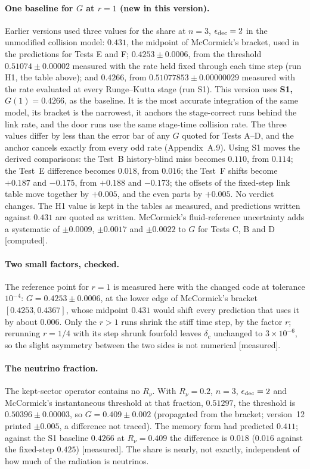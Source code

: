 \documentclass[11pt]{article}
\newcommand{\grade}[1]{\textsf{\small[#1]}}
\begin{document}
\paragraph{One baseline for $G$ at $r=1$ (new in this version).} Earlier versions used three values for the share at $n=3$, $\epsilon_{\rm dec}=2$ in the unmodified collision model: $0.431$, the midpoint of McCormick's bracket, used in the predictions for Tests E and F; $0.4253\pm0.0006$, from the threshold $0.51074\pm0.00002$ measured with the rate held fixed through each time step (run H1, the table above); and $0.4266$, from $0.51077853\pm0.00000029$ measured with the rate evaluated at every Runge--Kutta stage (run S1). This version uses \textbf{S1, $G(1)=0.4266$}, as the baseline. It is the most accurate integration of the same model, its bracket is the narrowest, it anchors the stage-correct runs behind the link rate, and the door runs use the same stage-time collision rate. The three values differ by less than the error bar of any $G$ quoted for Tests A--D, and the anchor cancels exactly from every odd rate (Appendix~A.9). Using S1 moves the derived comparisons: the Test~B history-blind miss becomes $0.110$, from $0.114$; the Test~E difference becomes $0.018$, from $0.016$; the Test~F shifts become $+0.187$ and $-0.175$, from $+0.188$ and $-0.173$; the offsets of the fixed-step link table move together by $+0.005$, and the even parts by $+0.005$. No verdict changes. The H1 value is kept in the tables as measured, and predictions written against $0.431$ are quoted as written. McCormick's fluid-reference uncertainty adds a systematic of $\pm0.0009$, $\pm0.0017$ and $\pm0.0022$ to $G$ for Tests C, B and D \grade{computed}.

\paragraph{Two small factors, checked.} The reference point for $r=1$ is measured here with the changed code at tolerance $10^{-4}$: $G=0.4253\pm0.0006$, at the lower edge of McCormick's bracket $[0.4253,0.4367]$, whose midpoint $0.431$ would shift every prediction that uses it by about $0.006$. Only the $r>1$ runs shrink the stiff time step, by the factor $r$; rerunning $r=1/4$ with its step shrunk fourfold leaves $\delta_c$ unchanged to $3\times10^{-6}$, so the slight asymmetry between the two sides is not numerical \grade{measured}.

\paragraph{The neutrino fraction.} The kept-sector operator contains no $R_\nu$. With $R_\nu=0.2$, $n=3$, $\epsilon_{\rm dec}=2$ and McCormick's instantaneous threshold at that fraction, $0.51297$, the threshold is $0.50396\pm0.00003$, so $G=0.409\pm0.002$ (propagated from the bracket; version~12 printed $\pm0.005$, a difference not traced). The memory form had predicted $0.411$; against the S1 baseline $0.4266$ at $R_\nu=0.409$ the difference is $0.018$ ($0.016$ against the fixed-step $0.425$) \grade{measured}. The share is nearly, not exactly, independent of how much of the radiation is neutrinos.
\end{document}
